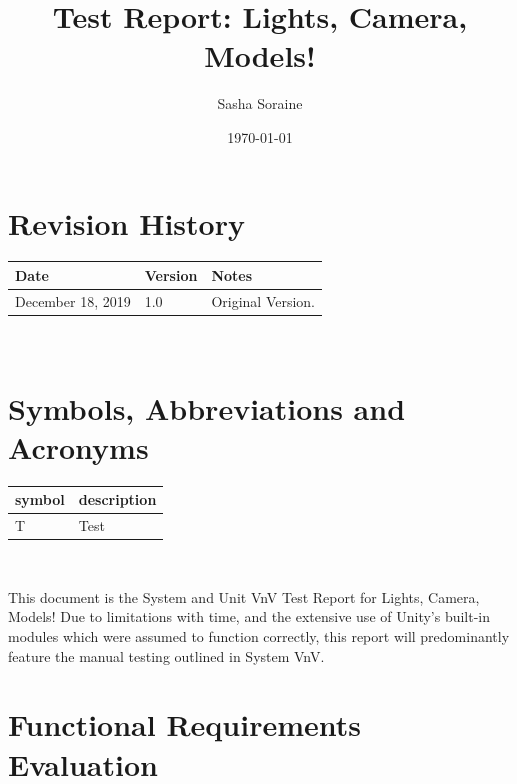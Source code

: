\documentclass[12pt, titlepage]{article}
\begin{document}
\title{Test Report: Lights, Camera, Models!} 
\author{Sasha Soraine}
\date{\today}
	
\maketitle


\section{Revision History}

\begin{tabularx}{\textwidth}{p{3cm}p{2cm}X}
\toprule {\bf Date} & {\bf Version} & {\bf Notes}\\
\midrule
December 18, 2019 & 1.0 & Original Version.\\
\bottomrule
\end{tabularx}

~\newpage

\section{Symbols, Abbreviations and Acronyms}

\renewcommand{\arraystretch}{1.2}
\begin{tabular}{l l} 
  \toprule		
  \textbf{symbol} & \textbf{description}\\
  \midrule 
  T & Test\\
  \bottomrule
\end{tabular}\\


\newpage

\tableofcontents

\listoftables %

\listoffigures %

\newpage


This document is the System and Unit VnV Test Report for Lights, Camera, Models!
Due to limitations with time, and the extensive use of Unity's built-in modules 
which were assumed to function correctly, this report will predominantly 
feature the manual testing outlined in System VnV.

\section{Functional Requirements Evaluation}
\end{document}
